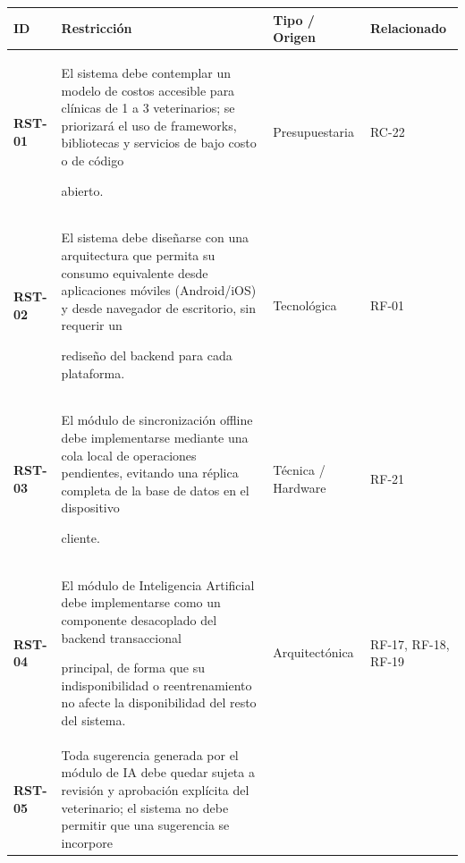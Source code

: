 \documentclass[
]{article}
\newcounter{none} %
\begin{document}
{\def\LTcaptype{none} %
\begin{longtable}[]{@{}
  >{\raggedright\arraybackslash}p{}
  >{\raggedright\arraybackslash}p{}
  >{\raggedright\arraybackslash}p{}
  >{\raggedright\arraybackslash}p{}@{}}
\toprule\noalign{}
\begin{minipage}[b]{\linewidth}\raggedright
\textbf{ID}
\end{minipage} & \begin{minipage}[b]{\linewidth}\raggedright
\textbf{Restricción}
\end{minipage} & \begin{minipage}[b]{\linewidth}\raggedright
\textbf{Tipo / Origen}
\end{minipage} & \begin{minipage}[b]{\linewidth}\raggedright
\textbf{Relacionado}
\end{minipage} \\
\midrule\noalign{}
\endhead
\bottomrule\noalign{}
\endlastfoot
\textbf{RST-01} & El sistema debe contemplar un modelo de costos
accesible para clínicas de 1 a 3 veterinarios; se priorizará el uso de
frameworks, bibliotecas y servicios de bajo costo o de código

abierto. & Presupuestaria & RC-22 \\
\textbf{RST-02} & El sistema debe diseñarse con una arquitectura que
permita su consumo equivalente desde aplicaciones móviles (Android/iOS)
y desde navegador de escritorio, sin requerir un

rediseño del backend para cada plataforma. & Tecnológica & RF-01 \\
\textbf{RST-03} & El módulo de sincronización offline debe implementarse
mediante una cola local de operaciones pendientes, evitando una réplica
completa de la base de datos en el dispositivo

cliente. & Técnica / Hardware & RF-21 \\
\textbf{RST-04} & El módulo de Inteligencia Artificial debe
implementarse como un componente desacoplado del backend transaccional

principal, de forma que su indisponibilidad o reentrenamiento no afecte
la disponibilidad del resto del sistema. & Arquitectónica & RF-17,
RF-18, RF-19 \\
\textbf{RST-05} & Toda sugerencia generada por el módulo de IA debe
quedar sujeta a revisión y aprobación explícita del veterinario; el
sistema no debe permitir que una sugerencia se incorpore


\end{longtable}}
\end{document}
